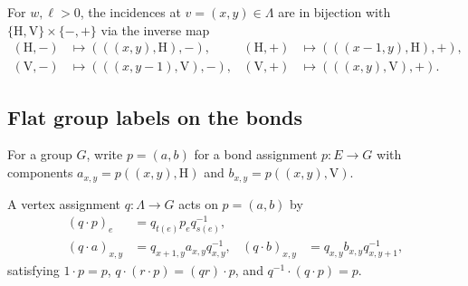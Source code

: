 \begin{definition}%
    \label{def:peps_labelled_incidence}
    \leanok
    For $w,\ell>0$, the incidences at $v=(x,y)\in\Lambda$ are in bijection with $\{\mathrm H,\mathrm V\}\times\{-,+\}$ via the inverse map
    \begin{align}
        (\mathrm H,-) & \longmapsto(((x,y),\mathrm H),-),            &
        (\mathrm H,+) & \longmapsto(((x-1,y),\mathrm H),+),\nonumber   \\
        (\mathrm V,-) & \longmapsto(((x,y-1),\mathrm V),-),          &
        (\mathrm V,+) & \longmapsto(((x,y),\mathrm V),+).
        \label{eq:peps_labelled_incidence}
    \end{align}
\end{definition}

\subsection{Flat group labels on the bonds}

\begin{definition}%
    \label{def:peps_labelled_pair}
    \leanok
    For a group $G$, write $p=(a,b)$ for a bond assignment $p:E\to G$ with components $a_{x,y}=p((x,y),\mathrm H)$ and $b_{x,y}=p((x,y),\mathrm V)$.
\end{definition}

\begin{definition}%
    \label{def:peps_bond_gauge}
    \leanok
    A vertex assignment $q:\Lambda\to G$ acts on $p=(a,b)$ by
    \begin{align}
        (q\cdot p)_e     & =q_{t(e)}p_eq_{s(e)}^{-1},\nonumber   \\
        (q\cdot a)_{x,y} & =q_{x+1,y}a_{x,y}q_{x,y}^{-1},      &
        (q\cdot b)_{x,y} & =q_{x,y}b_{x,y}q_{x,y+1}^{-1},
        \label{eq:peps_bond_gauge}
    \end{align}
    satisfying $1\cdot p=p$, $q\cdot(r\cdot p)=(qr)\cdot p$, and $q^{-1}\cdot(q\cdot p)=p$.
\end{definition}

